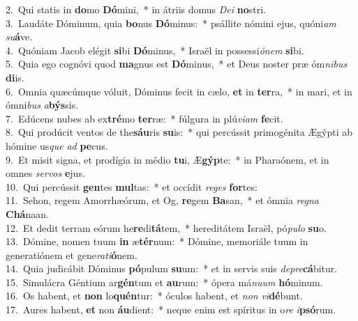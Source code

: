 {2.~}Qui statis in \textbf{do}mo \textbf{Dó}mini,~* in átriis domus \textit{De}\textit{i} \textbf{no}stri.\\
{3.~}Laudáte Dóminum, quia \textbf{bo}nus \textbf{Dó}minus:~* psállite nómini ejus, quóni\textit{am} \textit{su}\textbf{á}ve.\\
{4.~}Quóniam Jacob elégit \textbf{si}bi \textbf{Dó}minus,~* Israël in possessi\textit{ó}\textit{nem} \textbf{si}bi.\\
{5.~}Quia ego cognóvi quod \textbf{ma}gnus est \textbf{Dó}minus,~* et Deus noster præ óm\textit{ni}\textit{bus} \textbf{di}is.\\
{6.~}Omnia quæcúmque vóluit, Dóminus fecit in cælo, \textbf{et} in \textbf{ter}ra,~* in mari, et in ómni\textit{bus} \textit{a}\textbf{býs}sis.\\
{7.~}Edúcens nubes ab ex\textbf{tré}mo \textbf{ter}ræ:~* fúlgura in plú\textit{vi}\textit{am} \textbf{fe}cit.\\
{8.~}Qui prodúcit ventos de the\textbf{sáu}ris \textbf{su}is:~* qui percússit primogénita Ægýpti ab hómine us\textit{que} \textit{ad} \textbf{pe}cus.\\
{9.~}Et misit signa, et prodígia in médio \textbf{tu}i, Æ\textbf{gýp}te:~* in Pharaónem, et in omnes \textit{ser}\textit{vos} \textbf{e}jus.\\
{10.~}Qui percússit \textbf{gen}tes \textbf{mul}tas:~* et occídit \textit{re}\textit{ges} \textbf{for}tes:\\
{11.~}Sehon, regem Amorrhæórum, et Og, \textbf{re}gem \textbf{Ba}san,~* et ómnia \textit{re}\textit{gna} \textbf{Chá}naan.\\
{12.~}Et dedit terram eórum he\textbf{re}di\textbf{tá}tem,~* hereditátem Israël, pó\textit{pu}\textit{lo} \textbf{su}o.\\
{13.~}Dómine, nomen tuum \textbf{in} æ\textbf{tér}num:~* Dómine, memoriále tuum in generatiónem et gene\textit{ra}\textit{ti}\textbf{ó}nem.\\
{14.~}Quia judicábit Dóminus \textbf{pó}pulum \textbf{su}um:~* et in servis suis \textit{de}\textit{pre}\textbf{cá}bitur.\\
{15.~}Simulácra Géntium ar\textbf{gén}tum et \textbf{au}rum:~* ópera má\textit{nu}\textit{um} \textbf{hó}minum.\\
{16.~}Os habent, et \textbf{non} lo\textbf{quén}tur:~* óculos habent, et \textit{non} \textit{vi}\textbf{dé}bunt.\\
{17.~}Aures habent, \textbf{et} non \textbf{áu}dient:~* neque enim est spíritus in o\textit{re} \textit{i}\textbf{psó}rum.\\
